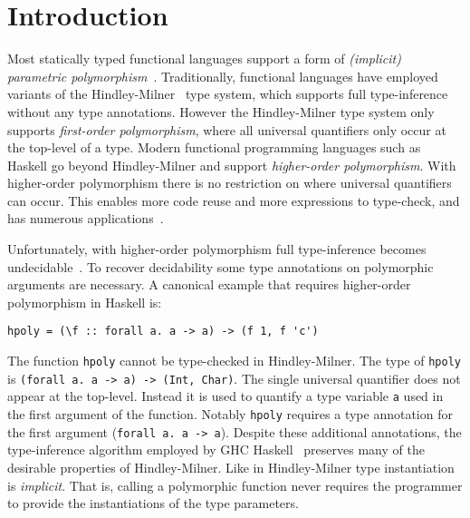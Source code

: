 \section{Introduction}

Most statically typed functional languages support a form of
\emph{(implicit) parametric polymorphism}~\cite{reynolds1983types}.
Traditionally, functional languages have employed variants of the
Hindley-Milner~\cite{hindley1969principal,milner1978theory,damas1982principal}
type system, which supports full type-inference without any type annotations.
However the Hindley-Milner type system only supports \emph{first-order
polymorphism}, where all universal quantifiers only occur at the top-level
of a type.  Modern functional programming languages such as Haskell go beyond
Hindley-Milner and support \emph{higher-order polymorphism}. With higher-order
polymorphism there is no restriction on where universal quantifiers can occur.
This enables more code reuse and more expressions to type-check, and has
numerous applications~\cite{jones1995functional,gill1993short,launchbury1995state,lammel2003scrap}.

Unfortunately, with higher-order polymorphism full type-inference becomes
undecidable~\cite{wells1999typability}. To recover decidability some type annotations 
on polymorphic arguments
are necessary. 
A canonical example that requires higher-order polymorphism in Haskell is:
\begin{verbatim}
hpoly = (\f :: forall a. a -> a) -> (f 1, f 'c')
\end{verbatim}
The function \verb|hpoly| cannot be
type-checked in Hindley-Milner.  The type of \verb|hpoly| is 
\verb|(forall a. a -> a) -> (Int, Char)|. The single universal quantifier
does not appear at the top-level. Instead it is used to quantify a
type variable \verb|a| used in the first argument of the
function.
Notably \verb|hpoly| requires a type annotation for the first
argument (\verb|forall a. a -> a|). 
Despite these additional annotations,
the type-inference algorithm employed by GHC Haskell~\cite{jones2007practical} preserves 
many of the desirable properties of Hindley-Milner. 
Like in Hindley-Milner type instantiation is \emph{implicit}. That is,
calling a polymorphic function never requires the programmer to 
provide the instantiations of the type parameters.

